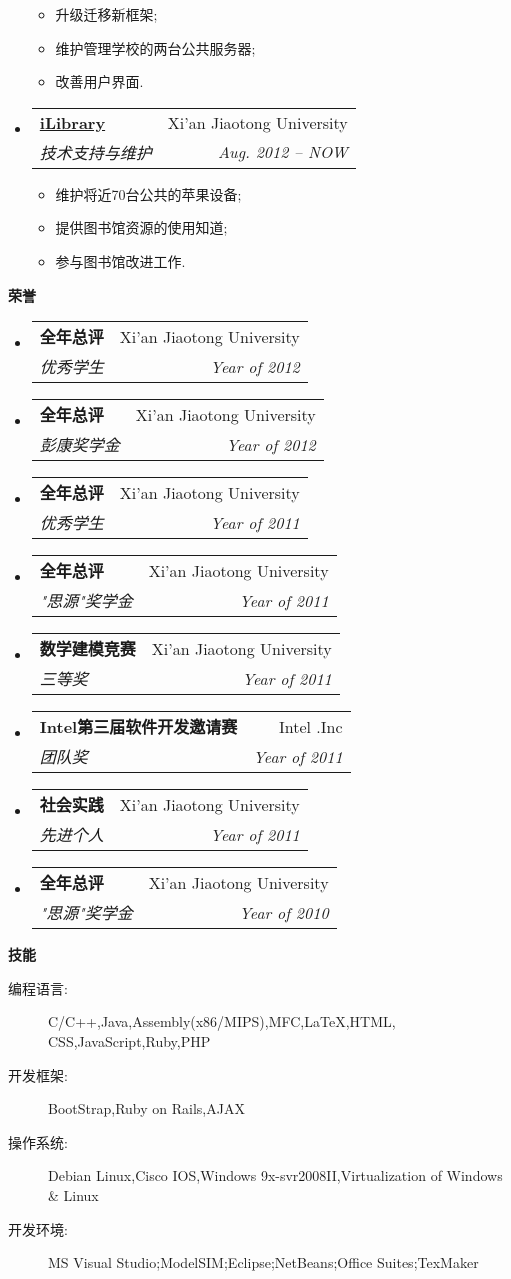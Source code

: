 \documentclass[letterpaper,11pt]{article}
\makeatletter
\newcommand{\resitem}[1]{\item #1 \vspace{-2pt}}
\newcommand{\resheading}[1]{{\large \colorbox{mygrey}{\begin{minipage}{\textwidth}{\textbf{#1 \vphantom{p\^{E}}}}\end{minipage}}}}
\newcommand{\ressubheading}[4]{
\begin{tabular*}{6.5in}{l@{\extracolsep{\fill}}r}
		\textbf{#1} & #2 \\
		\textit{#3} & \textit{#4} \\
\end{tabular*}\vspace{-6pt}}
\makeatother
\begin{document}
\begin{CJK}{UTF8}{gbsn}
\begin{itemize}
				{ \footnotesize
				\begin{itemize}
					\resitem{升级迁移新框架;}
					\resitem{维护管理学校的两台公共服务器;}
					\resitem{改善用户界面.}
				\end{itemize}
				}
		\item 
			\ressubheading{\href{http://www.lib.xjtu.edu.cn/}{iLibrary}}{Xi'an Jiaotong University}{技术支持与维护}{Aug. 2012 -- NOW}
				{ \footnotesize
				\begin{itemize}
					\resitem{维护将近70台公共的苹果设备;}
					\resitem{提供图书馆资源的使用知道;}
					\resitem{参与图书馆改进工作.}
				\end{itemize}
				}
	\end{itemize}	
	
\resheading{荣誉}
	\begin{itemize}
		\item
			\ressubheading{全年总评}{Xi'an Jiaotong University}{优秀学生}{Year of 2012}
		\item
			\ressubheading{全年总评}{Xi'an Jiaotong University}{彭康奖学金}{Year of 2012}
		\item
			\ressubheading{全年总评}{Xi'an Jiaotong University}{优秀学生}{Year of 2011}
		\item
			\ressubheading{全年总评}{Xi'an Jiaotong University}{"思源"奖学金}{Year of 2011}
		\item
			\ressubheading{数学建模竞赛}{Xi'an Jiaotong University}{三等奖}{Year of 2011}
		\item
			\ressubheading{Intel第三届软件开发邀请赛}{Intel .Inc}{团队奖}{Year of 2011}
		\item
			\ressubheading{社会实践}{Xi'an Jiaotong University}{先进个人}{Year of 2011}

		\item
			\ressubheading{全年总评}{Xi'an Jiaotong University}{"思源"奖学金}{Year of 2010}
		\end{itemize}
	
\resheading{技能}
	\begin{description}
		\item[编程语言:] { \footnotesize C/C++,Java,Assembly(x86/MIPS),MFC,LaTeX,HTML, CSS,JavaScript,Ruby,PHP}
		\item[开发框架:] { \footnotesize BootStrap,Ruby on Rails,AJAX}
		\item[操作系统:] { \footnotesize Debian Linux,Cisco IOS,Windows 9x-svr2008II,Virtualization of Windows \& Linux}
		\item[开发环境:]{\footnotesize {MS Visual Studio};{ModelSIM};{Eclipse};{NetBeans};{Office Suites};{TexMaker}}  
	\end{description} %
\end{CJK}
\end{document}
